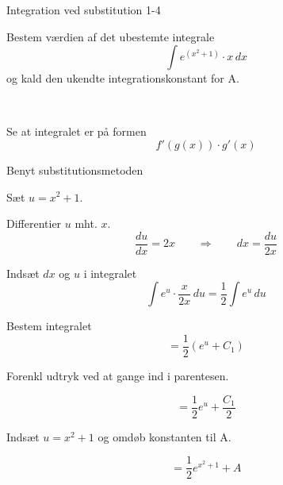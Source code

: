 \documentclass{article}
\begin{document}
\begin{exercise}{Integration ved substitution 1-4}
	
	
	Bestem værdien af det ubestemte integrale
	\[
	\int e^{(x^2+1)} \cdot x \, dx
	\]
	og kald den ukendte integrationskonstant for A.
	
	 \\
	
	
	
	\hint
	
	Se at integralet er på formen
	\[
	f'(g(x)) \cdot g'(x)
	\]
	
	\hint
	
	Benyt substitutionsmetoden
	
	\hint
	
	Sæt $u=x^2+1$.
	
	
	\hint
	
	Differentier $u$ mht. $x$.
	\[
	\frac{du}{dx} = 2x \qquad	\Rightarrow \qquad dx = \frac{du}{2x}
	\]
	
	\hint
	
	Indsæt $dx$ og $u$ i integralet
	\[
	\int e^{u} \cdot \frac{x}{2x} \, du = \frac{1}{2} \int e^u \, du
	\]
	
	\hint
	
	Bestem integralet
	\[
	= \frac{1}{2} \left( e^u + C_1 \right)
	\]
	
	\hint
	Forenkl udtryk ved at gange ind i parentesen.
	
	\hint
	
	\[
	= \frac{1}{2} e^u + \frac{C_1}{2}
	\]
	
	\hint
	
	Indsæt $u = x^2+1$ og omdøb konstanten  til A.
	
	\hint
	
	\[
	= \frac{1}{2} e^{x^2+1} + A
	\]
	
	
\end{exercise}

\newpage
\end{document}
